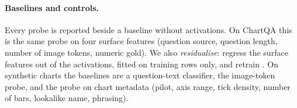 \paragraph{Baselines and controls.} Every probe is reported beside a baseline
without activations. On ChartQA this is the same probe on four surface features
(question source, question length, number of image tokens, numeric gold). We
also \emph{residualise}: regress the surface features out of the activations,
fitted on training rows only, and retrain \citep{sahoo2026linearprobes}. On
synthetic charts the baselines are a question-text classifier, the image-token
probe, and the probe on chart metadata (pilot, axis range, tick density, number
of bars, lookalike name, phrasing).
